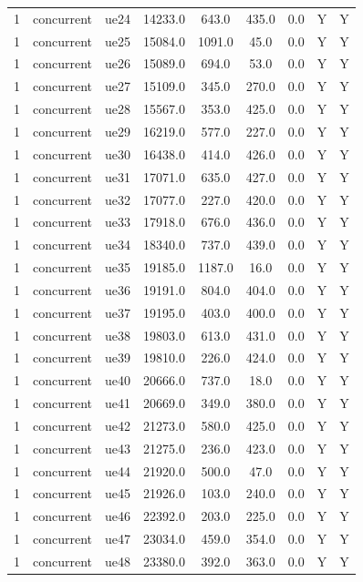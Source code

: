 \begin{table}[ht]
\begin{tabular}{|c|c|c|c|c|c|c|c|c|}
1 & concurrent & ue24 & 14233.0 & 643.0 & 435.0 & 0.0 & Y & Y \\
1 & concurrent & ue25 & 15084.0 & 1091.0 & 45.0 & 0.0 & Y & Y \\
1 & concurrent & ue26 & 15089.0 & 694.0 & 53.0 & 0.0 & Y & Y \\
1 & concurrent & ue27 & 15109.0 & 345.0 & 270.0 & 0.0 & Y & Y \\
1 & concurrent & ue28 & 15567.0 & 353.0 & 425.0 & 0.0 & Y & Y \\
1 & concurrent & ue29 & 16219.0 & 577.0 & 227.0 & 0.0 & Y & Y \\
1 & concurrent & ue30 & 16438.0 & 414.0 & 426.0 & 0.0 & Y & Y \\
1 & concurrent & ue31 & 17071.0 & 635.0 & 427.0 & 0.0 & Y & Y \\
1 & concurrent & ue32 & 17077.0 & 227.0 & 420.0 & 0.0 & Y & Y \\
1 & concurrent & ue33 & 17918.0 & 676.0 & 436.0 & 0.0 & Y & Y \\
1 & concurrent & ue34 & 18340.0 & 737.0 & 439.0 & 0.0 & Y & Y \\
1 & concurrent & ue35 & 19185.0 & 1187.0 & 16.0 & 0.0 & Y & Y \\
1 & concurrent & ue36 & 19191.0 & 804.0 & 404.0 & 0.0 & Y & Y \\
1 & concurrent & ue37 & 19195.0 & 403.0 & 400.0 & 0.0 & Y & Y \\
1 & concurrent & ue38 & 19803.0 & 613.0 & 431.0 & 0.0 & Y & Y \\
1 & concurrent & ue39 & 19810.0 & 226.0 & 424.0 & 0.0 & Y & Y \\
1 & concurrent & ue40 & 20666.0 & 737.0 & 18.0 & 0.0 & Y & Y \\
1 & concurrent & ue41 & 20669.0 & 349.0 & 380.0 & 0.0 & Y & Y \\
1 & concurrent & ue42 & 21273.0 & 580.0 & 425.0 & 0.0 & Y & Y \\
1 & concurrent & ue43 & 21275.0 & 236.0 & 423.0 & 0.0 & Y & Y \\
1 & concurrent & ue44 & 21920.0 & 500.0 & 47.0 & 0.0 & Y & Y \\
1 & concurrent & ue45 & 21926.0 & 103.0 & 240.0 & 0.0 & Y & Y \\
1 & concurrent & ue46 & 22392.0 & 203.0 & 225.0 & 0.0 & Y & Y \\
1 & concurrent & ue47 & 23034.0 & 459.0 & 354.0 & 0.0 & Y & Y \\
1 & concurrent & ue48 & 23380.0 & 392.0 & 363.0 & 0.0 & Y & Y \\

\end{tabular}
\end{table}
